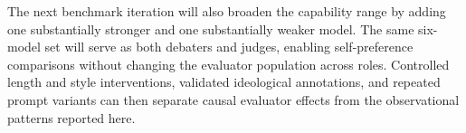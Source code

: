 \documentclass{article}
\begin{document}
The next benchmark iteration will also broaden the capability range by adding one substantially stronger and one substantially weaker model. The same six-model set will serve as both debaters and judges, enabling self-preference comparisons without changing the evaluator population across roles. Controlled length and style interventions, validated ideological annotations, and repeated prompt variants can then separate causal evaluator effects from the observational patterns reported here.





\FloatBarrier



\newpage

\end{document}
